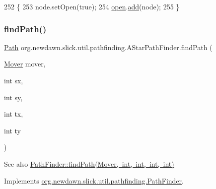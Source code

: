 \begin{DoxyCode}
252                                         \{
253         node.setOpen(\textcolor{keyword}{true});
254         \mbox{\hyperlink{classorg_1_1newdawn_1_1slick_1_1util_1_1pathfinding_1_1_a_star_path_finder_a8614e10a1dd039e67263932fdc1206b2}{open}}.\mbox{\hyperlink{classorg_1_1newdawn_1_1slick_1_1util_1_1pathfinding_1_1_a_star_path_finder_1_1_priority_list_a0515cf76de099aa00ffb61ef30fb6cb8}{add}}(node);
255     \}
\end{DoxyCode}
\mbox{\label{classorg_1_1newdawn_1_1slick_1_1util_1_1pathfinding_1_1_a_star_path_finder_a603b1ac6a40ac99d3bc38740f46b2706}} 
\subsubsection{\texorpdfstring{find\+Path()}{findPath()}}
{\footnotesize\ttfamily \mbox{\hyperlink{classorg_1_1newdawn_1_1slick_1_1util_1_1pathfinding_1_1_path}{Path}} org.\+newdawn.\+slick.\+util.\+pathfinding.\+A\+Star\+Path\+Finder.\+find\+Path (\begin{DoxyParamCaption}\item[{\mbox{\hyperlink{interfaceorg_1_1newdawn_1_1slick_1_1util_1_1pathfinding_1_1_mover}{Mover}}}]{mover,  }\item[{int}]{sx,  }\item[{int}]{sy,  }\item[{int}]{tx,  }\item[{int}]{ty }\end{DoxyParamCaption})\hspace{0.3cm}{\ttfamily [inline]}}

\begin{DoxySeeAlso}{See also}
\mbox{\hyperlink{interfaceorg_1_1newdawn_1_1slick_1_1util_1_1pathfinding_1_1_path_finder_a74ba20251bc78c37f91821c71a97a58d}{Path\+Finder\+::find\+Path(\+Mover, int, int, int, int)}} 
\end{DoxySeeAlso}


Implements \mbox{\hyperlink{interfaceorg_1_1newdawn_1_1slick_1_1util_1_1pathfinding_1_1_path_finder_a74ba20251bc78c37f91821c71a97a58d}{org.\+newdawn.\+slick.\+util.\+pathfinding.\+Path\+Finder}}.


